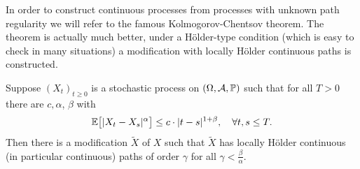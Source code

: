 In order to construct continuous processes from processes with unknown path regularity we will refer to the famous Kolmogorov-Chentsov theorem. The theorem is actually much better, under a H\"older-type condition (which is easy to check in many situations) a modification with locally H\"older continuous paths is constructed.
\begin{lAussageWerkzeug}
\begin{theorem}\label{thm:chentsov}
	Suppose $(X_t)_{t\geq 0}$ is a stochastic process on $(\Omega,\mathcal{A},\mathbb{P})$ such that for all $T>0$ there are $c, \alpha$, $\beta$ with
	\begin{align*}
		\mathbb{E}\big[\lvert X_t - X_s \rvert^{\alpha}\big] \leq c \cdot \lvert t - s \rvert^{1+\beta},\quad \forall t,s \leq T.
	\end{align*}
	Then there is a modification $\tilde X$ of $X$ such that $\tilde X$ has locally H\"older continuous (in particular continuous) paths of order $\gamma$ for all $\gamma<\frac{\beta}{\alpha}$.
\end{theorem}
\end{lAussageWerkzeug}
